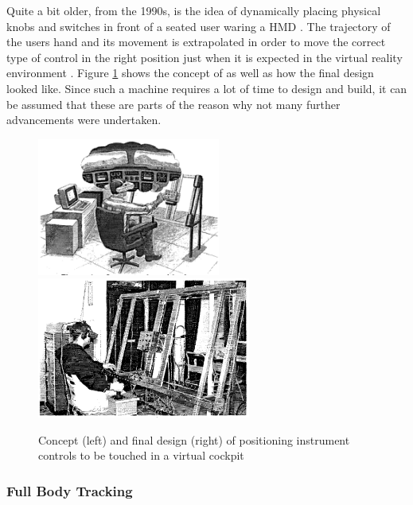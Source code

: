 Quite a bit older, from the 1990s, is the idea of dynamically placing physical knobs and switches in front of a seated user waring a HMD \citep{Latham1997}. The trajectory of the users hand and its movement is extrapolated in order to move the correct type of control in the right position just when it is expected in the virtual reality environment \citep{Latham1997}. Figure \ref{fig:touchcockpit} shows the concept of \cite{Latham1997} as well as how the final design looked like. Since such a machine requires a lot of time to design and build, it can be assumed that these are parts of the reason why not many further advancements were undertaken.
\begin{figure}[h]
	\begin{center}
		\includegraphics[width=6cm]{03_Figures/05_LitReview/Latham1997_Concept.png}
		\includegraphics[width=7cm]{03_Figures/05_LitReview/Latham1997_FinalDesign.png}
		\caption[Concept and final design of positioning instrument controls to be touched in a virtual cockpit]{Concept (left) and final design (right) of positioning instrument controls to be touched in a virtual cockpit \citep{Latham1997}}
		\label{fig:touchcockpit}
	\end{center}
\end{figure}


\subsubsection{Full Body Tracking}

